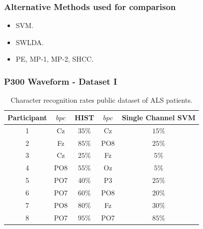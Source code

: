 \documentclass[aspectratio=169]{beamer}
\begin{document}
\begin{frame}
\frametitle{Alternative Methods used for comparison}
\begin{center}
\begin{itemize}
 \item<1-> SVM.
 \item<2-> SWLDA.
 \item<3-> PE, MP-1, MP-2, SHCC.
\end{itemize}
\end{center}
\end{frame} 


\begin{frame}
\frametitle{P300 Waveform - Dataset I}
\begin{center}
\begin{table}[h!]
\caption{Character recognition rates public dataset of ALS patients.}
\centering
\begin{tabular}{c|cc|cc}
\toprule
\textbf{Participant}	&  $bpc$ 	&  HIST &  $bpc$	&  Single Channel SVM \\
\midrule
1     &     Cz   &   $35\%$    &  Cz   & $15\%$   \\
2     &     Fz   &   $85\%$      &  PO8   & $25\%$   \\
3     &     Cz   &   $25\%$    &  Fz   & $5\%$   \\
4     &     PO8 &   $55\%$   &  Oz   & $5\%$    \\
5     &     PO7 &   $40\%$    &  P3   & $25\%$   \\
6     &     PO7 &   $60\%$  &  PO8   & $20\%$    \\
7     &     PO8 &   $80\%$   &  Fz   & $30\%$     \\
8     &     PO7 &   $95\%$     &  PO7   & $85\%$ \\

\end{tabular}
\label{tab:resultsals}
\end{table}
\end{center}
\end{frame} 
\end{document}
